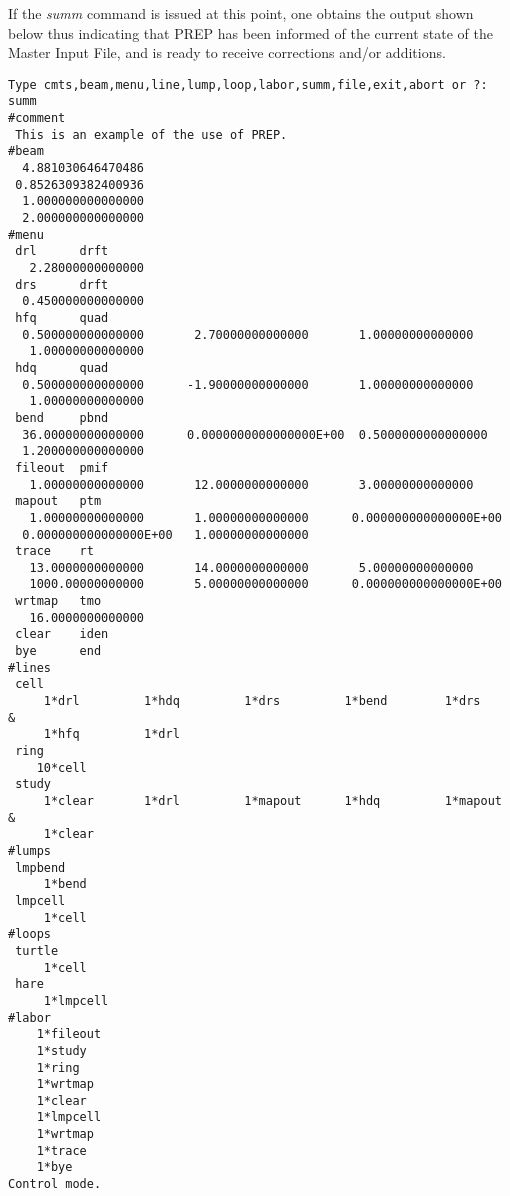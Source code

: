      If the {\em summ} command is issued at this point, one obtains the output
shown below thus indicating that PREP has been informed of the current
state of the Master Input File, and is ready to receive corrections and/or
additions.

\begin{footnotesize}
\begin{verbatim}
Type cmts,beam,menu,line,lump,loop,labor,summ,file,exit,abort or ?:
summ
#comment
 This is an example of the use of PREP.
#beam
  4.881030646470486
 0.8526309382400936
  1.000000000000000
  2.000000000000000
#menu
 drl      drft
   2.28000000000000
 drs      drft
  0.450000000000000
 hfq      quad
  0.500000000000000       2.70000000000000       1.00000000000000
   1.00000000000000
 hdq      quad
  0.500000000000000      -1.90000000000000       1.00000000000000
   1.00000000000000
 bend     pbnd
  36.00000000000000      0.0000000000000000E+00  0.5000000000000000
  1.200000000000000
 fileout  pmif
   1.00000000000000       12.0000000000000       3.00000000000000
 mapout   ptm
   1.00000000000000       1.00000000000000      0.000000000000000E+00
  0.000000000000000E+00   1.00000000000000
 trace    rt
   13.0000000000000       14.0000000000000       5.00000000000000
   1000.00000000000       5.00000000000000      0.000000000000000E+00
 wrtmap   tmo
   16.0000000000000
 clear    iden
 bye      end
#lines
 cell
     1*drl         1*hdq         1*drs         1*bend        1*drs      &
     1*hfq         1*drl
 ring
    10*cell
 study
     1*clear       1*drl         1*mapout      1*hdq         1*mapout   &
     1*clear
#lumps
 lmpbend
     1*bend
 lmpcell
     1*cell
#loops
 turtle
     1*cell
 hare
     1*lmpcell
#labor
    1*fileout
    1*study
    1*ring
    1*wrtmap
    1*clear
    1*lmpcell
    1*wrtmap
    1*trace
    1*bye
Control mode.
\end{verbatim}
\end{footnotesize}

